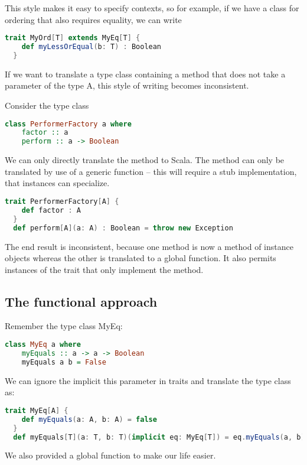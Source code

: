 This style makes it easy to specify contexts, so for example, if we have
a class  for ordering that also requires equality, we can write
\begin{lstlisting}[language=Scala,gobble=2]
  trait MyOrd[T] extends MyEq[T] {
    def myLessOrEqual(b: T) : Boolean
  }
\end{lstlisting}

If we want to translate a type class containing a method that does not take a
parameter of the type A, this style of writing becomes inconsistent.

\ex Consider the type class
\begin{lstlisting}[language=Haskell,gobble=2]
  class PerformerFactory a where
    factor :: a
    perform :: a -> Boolean
\end{lstlisting}
We can only directly translate the  method to Scala. The 
method can only be translated by use of a generic function -- this will
require a stub implementation, that instances can specialize.
\begin{lstlisting}[language=Scala,gobble=2]
  trait PerformerFactory[A] {
    def factor : A
  }
  def perform[A](a: A) : Boolean = throw new Exception
\end{lstlisting}
The end result is inconsistent, because one method is now a method of
instance objects whereas the other is translated to a global function. It
also permits instances of the trait that only implement the 
method.
\subsection{The functional approach}
Remember the type class MyEq:
\begin{lstlisting}[language=Haskell,gobble=2]
  class MyEq a where
    myEquals :: a -> a -> Boolean
    myEquals a b = False
\end{lstlisting}
We can ignore the implicit this parameter in traits and translate the type
class as:
\begin{lstlisting}[language=Scala,gobble=2]
  trait MyEq[A] {
    def myEquals(a: A, b: A) = false
  }
  def myEquals[T](a: T, b: T)(implicit eq: MyEq[T]) = eq.myEquals(a, b)
\end{lstlisting}
We also provided a global  function to make our life easier.

